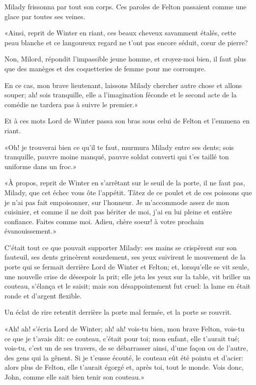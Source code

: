 Milady frissonna par tout son corps. Ces paroles de Felton passaient comme une glace par toutes ses veines. 

«Ainsi, reprit de Winter en riant, ces beaux cheveux savamment étalés, cette peau blanche et ce langoureux regard ne t'ont pas encore séduit, cœur de pierre? 

\speak  Non, Milord, répondit l'impassible jeune homme, et croyez-moi bien, il faut plus que des manèges et des coquetteries de femme pour me corrompre. 

\speak  En ce cas, mon brave lieutenant, laissons Milady chercher autre chose et allons souper; ah! sois tranquille, elle a l'imagination féconde et le second acte de la comédie ne tardera pas à suivre le premier.» 

Et à ces mots Lord de Winter passa son bras sous celui de Felton et l'emmena en riant. 

«Oh! je trouverai bien ce qu'il te faut, murmura Milady entre ses dents; sois tranquille, pauvre moine manqué, pauvre soldat converti qui t'es taillé ton uniforme dans un froc.» 

«À propos, reprit de Winter en s'arrêtant sur le seuil de la porte, il ne faut pas, Milady, que cet échec vous ôte l'appétit. Tâtez de ce poulet et de ces poissons que je n'ai pas fait empoisonner, sur l'honneur. Je m'accommode assez de mon cuisinier, et comme il ne doit pas hériter de moi, j'ai en lui pleine et entière confiance. Faites comme moi. Adieu, chère soeur! à votre prochain évanouissement.» 

C'était tout ce que pouvait supporter Milady: ses mains se crispèrent sur son fauteuil, ses dents grincèrent sourdement, ses yeux suivirent le mouvement de la porte qui se fermait derrière Lord de Winter et Felton; et, lorsqu'elle se vit seule, une nouvelle crise de désespoir la prit; elle jeta les yeux sur la table, vit briller un couteau, s'élança et le saisit; mais son désappointement fut cruel: la lame en était ronde et d'argent flexible. 

Un éclat de rire retentit derrière la porte mal fermée, et la porte se rouvrit. 

«Ah! ah! s'écria Lord de Winter; ah! ah! vois-tu bien, mon brave Felton, vois-tu ce que je t'avais dit: ce couteau, c'était pour toi; mon enfant, elle t'aurait tué; vois-tu, c'est un de ses travers, de se débarrasser ainsi, d'une façon ou de l'autre, des gens qui la gênent. Si je t'eusse écouté, le couteau eût été pointu et d'acier: alors plus de Felton, elle t'aurait égorgé et, après toi, tout le monde. Vois donc, John, comme elle sait bien tenir son couteau.» 

